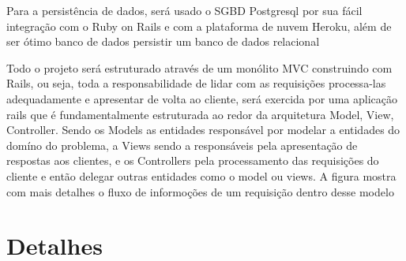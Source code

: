 Para a persistência de dados, será usado o SGBD Postgresql por sua fácil integração com o Ruby on Rails e com a plataforma de nuvem Heroku, além de ser ótimo banco de dados persistir um banco de dados relacional

Todo o projeto será estruturado através de um monólito MVC construindo com Rails, ou seja, toda a responsabilidade de lidar com as requisições processa-las adequadamente e apresentar de volta ao cliente, será  exercida por uma aplicação rails que é fundamentalmente estruturada ao redor da arquitetura Model, View, Controller. Sendo os Models as entidades responsável por modelar a entidades do domíno do problema, a Views sendo a responsáveis pela apresentação de respostas aos clientes, e os Controllers pela processamento das requisições do cliente e então delegar outras entidades como o model ou views. A figura mostra com mais detalhes o fluxo de informoções de um requisição dentro desse modelo



\section{Detalhes}
